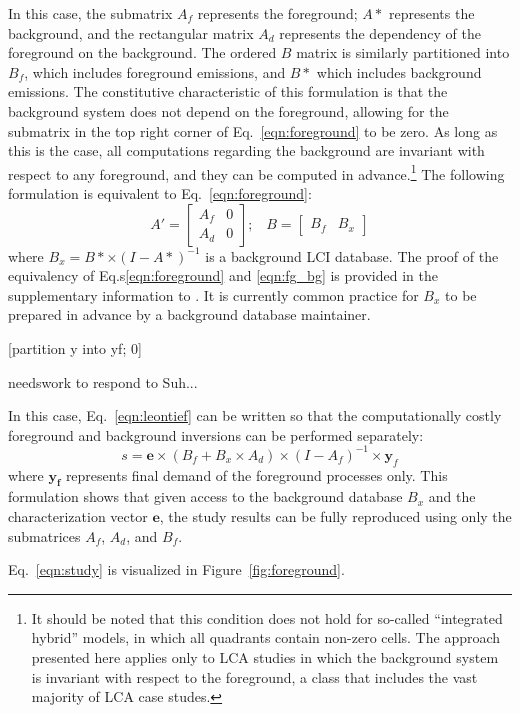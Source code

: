 
In this case, the submatrix $A_f$ represents the foreground; $A*$ represents the background, and the rectangular matrix $A_d$ represents the dependency of the foreground on the background.  The ordered $B$ matrix is similarly partitioned into $B_f$, which includes foreground emissions, and $B*$ which includes background emissions. The constitutive characteristic of this formulation is that the background system does not depend on the foreground, allowing for the submatrix in the top right corner of Eq.~\ref{eqn:foreground} to be zero.  As long as this is the case, all computations regarding the background are invariant with respect to any foreground, and they can be computed in advance.\footnote{It should be noted that this condition does not hold for so-called ``integrated hybrid'' models, in which all quadrants contain non-zero cells.  The approach presented here applies only to LCA studies in which the background system is invariant with respect to the foreground, a class that includes the vast majority of LCA case studes.}  The following formulation is equivalent to Eq.~\ref{eqn:foreground}:
\begin{equation}
 A' = \left[\begin{array}{cc} 
A_f &  0 \\
A_d & 0 
   \end{array}\right];\;\;\;  B = \left[\begin{array}{cc} B_f & B_x \end{array}\right ]
\label{eqn:fg_bg}
\end{equation}
where $B_x = B* \times (I - A*)^{-1}$ is a background LCI database.  The proof of the equivalency of Eq.s\ref{eqn:foreground} and \ref{eqn:fg_bg} is provided in the supplementary information to \cite{Kuczenski_JLCA_2015}.  It is currently common practice for $B_x$ to be prepared in advance by a background database maintainer.  

[partition y into yf; 0]

needswork to respond to Suh...



In this case, Eq.~\ref{eqn:leontief} can be written so that the computationally costly foreground and background inversions can be performed separately:
\begin{equation}
s = \mathbf{e} \times (B_f + B_x\times A_d) \times (I - A_f)^{-1} \times \mathbf{y}_f
\label{eqn:study}
\end{equation}
where $\mathbf{y_f}$ represents final demand of the foreground processes only.  This formulation shows that given access to the background database $B_x$ and the characterization vector $\mathbf{e}$, the study results can be fully reproduced using only the submatrices $A_f$, $A_d$, and $B_f$. 


Eq.~\ref{eqn:study} is visualized in Figure~\ref{fig:foreground}.  

